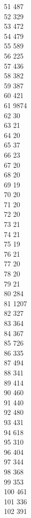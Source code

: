 { 51	487 \\
 52	329 \\
 53	472 \\
 54	479 \\
 55	589 \\
 56	225 \\
 57	436 \\
 58	382 \\
 59	387 \\
 60	421 \\
 61	9874 \\
 62	30 \\
 63	21 \\
 64	20 \\
 65	37 \\
 66	23 \\
 67	20 \\
 68	20 \\
 69	19 \\
 70	20 \\
 71	20 \\
 72	20 \\
 73	21 \\
 74	21 \\
 75	19 \\
 76	21 \\
 77	20 \\
 78	20 \\
 79	21 \\
 80	284 \\
 81	1207 \\
 82	327 \\
 83	364 \\
 84	367 \\
 85	726 \\
 86	335 \\
 87	494 \\
 88	341 \\
 89	414 \\
 90	460 \\
 91	440 \\
 92	480 \\
 93	431 \\
 94	618 \\
 95	310 \\
 96	404 \\
 97	344 \\
 98	368 \\
 99	353 \\
 100	461 \\
 101	336 \\
 102	391 \\
}
